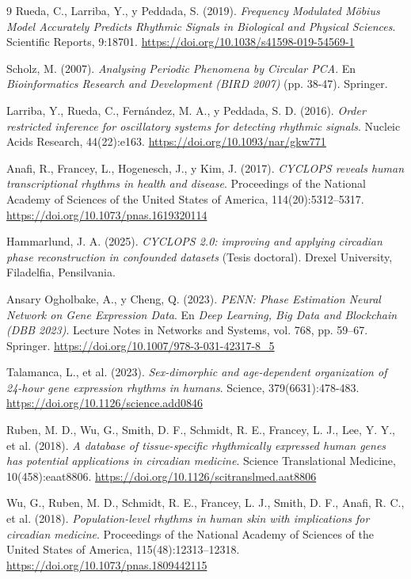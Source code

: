 \documentclass[12pt, a4paper]{report}
\begin{document}
\begin{thebibliography}{9}
Rueda, C., Larriba, Y., y Peddada, S. (2019).
\textit{Frequency Modulated Möbius Model Accurately Predicts Rhythmic Signals in Biological and Physical Sciences}.
Scientific Reports, 9:18701. \url{https://doi.org/10.1038/s41598-019-54569-1}

Scholz, M. (2007).
\textit{Analysing Periodic Phenomena by Circular PCA}.
En \textit{Bioinformatics Research and Development (BIRD 2007)} (pp. 38-47). Springer.

Larriba, Y., Rueda, C., Fernández, M. A., y Peddada, S. D. (2016).
\textit{Order restricted inference for oscillatory systems for detecting rhythmic signals}.
Nucleic Acids Research, 44(22):e163. \url{https://doi.org/10.1093/nar/gkw771}

Anafi, R., Francey, L., Hogenesch, J., y Kim, J. (2017).
\textit{CYCLOPS reveals human transcriptional rhythms in health and disease}.
Proceedings of the National Academy of Sciences of the United States of America, 114(20):5312--5317. \url{https://doi.org/10.1073/pnas.1619320114}

Hammarlund, J. A. (2025).
\textit{CYCLOPS 2.0: improving and applying circadian phase reconstruction in confounded datasets} (Tesis doctoral).
Drexel University, Filadelfia, Pensilvania.

Ansary Ogholbake, A., y Cheng, Q. (2023).
\textit{PENN: Phase Estimation Neural Network on Gene Expression Data}.
En \textit{Deep Learning, Big Data and Blockchain (DBB 2023)}. Lecture Notes in Networks and Systems, vol. 768, pp. 59--67. Springer. \url{https://doi.org/10.1007/978-3-031-42317-8_5}

Talamanca, L., et al. (2023).
\textit{Sex-dimorphic and age-dependent organization of 24-hour gene expression rhythms in humans}.
Science, 379(6631):478-483. \url{https://doi.org/10.1126/science.add0846}

Ruben, M. D., Wu, G., Smith, D. F., Schmidt, R. E., Francey, L. J., Lee, Y. Y., et al. (2018).
\textit{A database of tissue-specific rhythmically expressed human genes has potential applications in circadian medicine}.
Science Translational Medicine, 10(458):eaat8806. \url{https://doi.org/10.1126/scitranslmed.aat8806}

Wu, G., Ruben, M. D., Schmidt, R. E., Francey, L. J., Smith, D. F., Anafi, R. C., et al. (2018).
\textit{Population-level rhythms in human skin with implications for circadian medicine}.
Proceedings of the National Academy of Sciences of the United States of America, 115(48):12313--12318. \url{https://doi.org/10.1073/pnas.1809442115}


\end{thebibliography}
\end{document}
